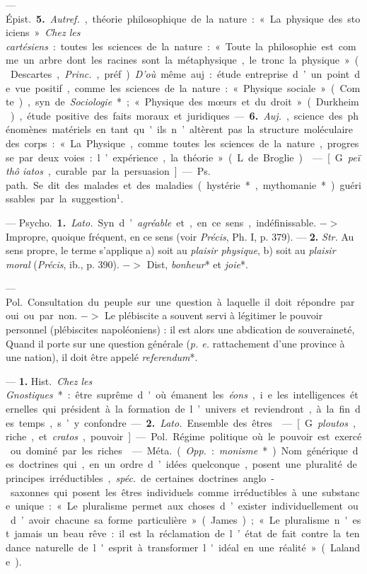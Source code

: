 \begin{itemize}[leftmargin=1cm, label=, itemsep=1pt]
 — \si{Épist.} {\bf 5.} {\it Autref.}, théorie
philosophique de la nature : « La physique des stoiciens ». {\it Chez les
cartésiens} : toutes les sciences de la nature : « Toute la philosophie est
comme un arbre dont les racines sont la métaphysique, le tronc la physique
» (Descartes, {\it Princ.}, préf.). {\it D'où} même auj. : étude entreprise
d’un point de vue positif, comme les sciences de la nature : « Physique
sociale » (Comte), syn. de {\it Sociologie}* ; « Physique des mœurs et du
droit » (Durkheim), étude positive des faits moraux et juridiques. — {\bf 6.}
{\it Auj.}, science des phénomènes matériels en tant qu'ils n’altèrent pas la
structure moléculaire des corps : « La Physique, comme toutes les sciences de
la nature, progresse par deux voies : l’expérience, la théorie » (L. de
Broglie).

 — [G. {\it peïthô iatos}, curable par la persuasion] —
\si{Ps. path.} Se dit des malades et des maladies (hystérie*, mythomanie*)
guérissables par la suggestion$^1$.

 — \si{Psycho.} {\bf 1.} {\it Lato.} Syn. d’{\it agréable} et, en
ce sens, indéfinissable. $->$ Impropre, quoique fréquent, en ce sens (voir
{\it Précis}, Ph. I, p. 379). — {\bf 2.} {\it Str.} Au sens propre, le terme
s'applique {\it }a) soit au {\it plaisir physique}, {\it }b) soit au {\it
plaisir moral} ({\it Précis}, ib., p. 390). $->$ Dist, {\it bonheur}* et {\it
joie}*.

 — \si{Pol.} Consultation du peuple sur une question à
laquelle il doit répondre par oui ou par non. $->$ Le plébiscite a souvent
servi à légitimer le pouvoir personnel (plébiscites napoléoniens) : il est
alors une abdication de souveraineté, Quand il porte sur une question
générale ({\it p. e.} rattachement d'une province à une nation), il doit être
appelé {\it referendum}*.

 — {\bf 1.} \si{Hist.} {\it Chez les Gnostiques}* : être suprême
d'où émanent les {\it éons}, i.e. les intelligences éternelles qui président
à la formation de l’univers et reviendront, à la fin des temps, s’y
confondre. — {\bf 2.} {\it Lato.} Ensemble des êtres.

 — [G. {\it ploutos}, riche, et {\it cratos}, pouvoir] —
\si{Pol.} Régime politique où le pouvoir est exercé ou dominé par les riches.

 — \si{Méta.} ({\it Opp.} : {\it monisme}*). Nom générique des
doctrines qui, en un ordre d’idées quelconque, posent une pluralité de
principes irréductibles, {\it spéc.} de certaines doctrines anglo-saxonnes
qui posent les êtres individuels comme irréductibles à une substance unique :
« Le pluralisme permet aux choses d’exister individuellement ou d’avoir
chacune sa forme particulière » (James) ; « Le pluralisme n'est jamais un
beau rêve : il est la réclamation de l’état de fait contre la tendance
naturelle de l'esprit à transformer l'idéal en une réalité » (Lalande).


\end{itemize}
